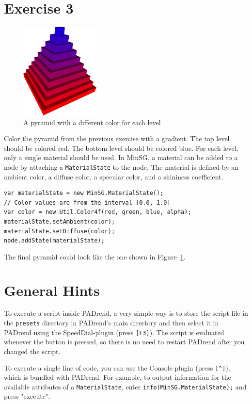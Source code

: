 \documentclass[a4paper,DIV=12]{scrartcl}
\begin{document}
\section*{Exercise 3}
\begin{figure}[htbp]
	\centering
	\includegraphics[width=4cm]{pyramid_colored}
	\caption{A pyramid with a different color for each level}
	\label{fig:pyramid_colored}
\end{figure}
Color the pyramid from the previous exercise with a gradient.
The top level should be colored red.
The bottom level should be colored blue.
For each level, only a single material should be used.
In MinSG, a material can be added to a node by attaching a \lstinline!MaterialState! to the node.
The material is defined by an ambient color, a diffuse color, a specular color, and a shininess coefficient.
\begin{lstlisting}
var materialState = new MinSG.MaterialState();
// Color values are from the interval [0.0, 1.0]
var color = new Util.Color4f(red, green, blue, alpha);
materialState.setAmbient(color);
materialState.setDiffuse(color);
node.addState(materialState);
\end{lstlisting}
The final pyramid could look like the one shown in Figure~\ref{fig:pyramid_colored}.

\section*{General Hints}
To execute a script inside PADrend, a very simple way is to store the script file in the \texttt{presets} directory in PADrend's main directory and then select it in PADrend using the SpeedDial-plugin (press \texttt{[F3]}).
The script is evaluated whenever the button is pressed, so there is no need to restart PADrend after you changed the script.

To execute a single line of code, you can use the Console plugin (press \texttt{[\^{}]}), which is bundled with PADrend.
For example, to output information for the available attributes of a \lstinline!MaterialState!, enter \lstinline!info(MinSG.MaterialState);! and press "execute".
\end{document}

